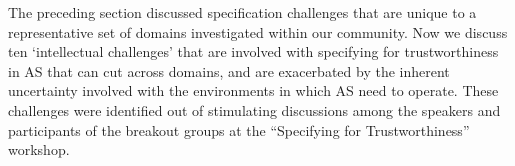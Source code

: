 \documentclass[sigconf,nonacm]{acmart}%
\begin{document}
The preceding section discussed specification challenges that are unique to a representative set of domains investigated within our community. Now we discuss ten `intellectual challenges' that are involved with specifying for trustworthiness in AS that can cut across domains, and are exacerbated by the inherent uncertainty involved with the environments in which AS need to operate. 
These challenges were identified out of stimulating discussions among the speakers and participants of the breakout groups at the ``Specifying for Trustworthiness'' workshop. 
\end{document}
